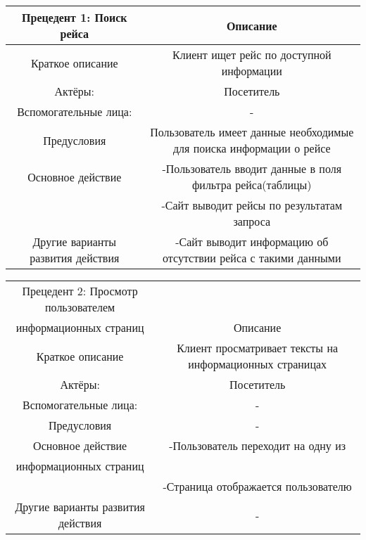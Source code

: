 \begin{table}[h]
    \begin{tabular}{|c|c|}
    \hline
    Прецедент 1: Поиск рейса          & Описание                                                                                              \\ \hline
    Краткое описание                  & Клиент ищет рейс по доступной информации                                                              \\ \hline
    Актёры:                           & Посетитель                                                                                            \\ \hline
    Вспомогательные лица:             & -                                                                                                     \\ \hline
    Предусловия                       & Пользователь имеет данные необходимые для поиска информации о рейсе                                   \\ \hline
    Основное действие                 & -Пользователь вводит данные в поля фильтра рейса(таблицы)\\ &-Сайт выводит рейсы по результатам запроса \\ \hline
    Другие варианты развития действия & -Сайт выводит информацию об отсутствии рейса с такими данными                                         \\ \hline
    \end{tabular}
\end{table}

\begin{table}[h]
    \begin{tabular}{|c|c|}
    \hline
    Прецедент 2: Просмотр пользователем\\ информационных страниц          & Описание                                                                                              \\ \hline
    Краткое описание                  & Клиент просматривает тексты на информационных страницах                                                            \\ \hline
    Актёры:                           & Посетитель                                                                                            \\ \hline
    Вспомогательные лица:             & -                                                                                                     \\ \hline
    Предусловия                       & -                                   \\ \hline
    Основное действие                 & -Пользователь переходит на одну из\\ информационных страниц\\ &-Страница отображается пользователю \\ \hline
    Другие варианты развития действия & -                                        \\ \hline
    \end{tabular}
\end{table}

